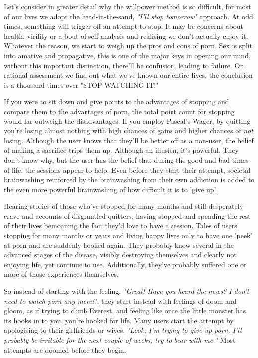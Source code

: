 \documentclass[easypeasy.tex]{subfiles}
\begin{document}
Let's consider in greater detail why the willpower method is so difficult, for most of our lives we adopt the head-in-the-sand, \textit{"I'll stop tomorrow"} approach. At odd times, something will trigger off an attempt to stop. It may be concerns about health, virility or a bout of self-analysis and realising we don't actually enjoy it. Whatever the reason, we start to weigh up the pros and cons of porn. Sex is split into amative and propagative, this is one of the major keys in opening our mind, without this important distinction, there'll be confusion, leading to failure. On rational assessment we find out what we've known our entire lives, the conclusion is a thousand times over "STOP WATCHING IT!"

If you were to sit down and give points to the advantages of stopping and compare them to the advantages of porn, the total point count for stopping would far outweigh the disadvantages. If you employ Pascal's Wager, by quitting you're losing almost nothing with high chances of gains and higher chances of \textit{not} losing. Although the user knows that they'll be better off as a non-user, the belief of making a sacrifice trips them up. Although an illusion, it's powerful. They don't know why, but the user has the belief that during the good and bad times of life, the sessions appear to help. Even before they start their attempt, societal brainwashing reinforced by the brainwashing from their own addiction is added to the even more powerful brainwashing of how difficult it is to 'give up'.

Hearing stories of those who've stopped for many months and still desperately crave and accounts of disgruntled quitters, having stopped and spending the rest of their lives bemoaning the fact they'd love to have a session. Tales of users stopping for many months or years and living happy lives only to have one 'peek' at porn and are suddenly hooked again. They probably know several in the advanced stages of the disease, visibly destroying themselves and clearly not enjoying life, yet continue to use. Additionally, they've probably suffered one or more of those experiences themselves.

So instead of starting with the feeling, \textit{"Great! Have you heard the news? I don't need to watch porn any more!"}, they start instead with feelings of doom and gloom, as if trying to climb Everest, and feeling like once the little monster has its hooks in to you, you're hooked for life. Many users start the attempt by apologising to their girlfriends or wives, \textit{"Look, I'm trying to give up porn. I'll probably be irritable for the next couple of weeks, try to bear with me."} Most attempts are doomed before they begin.
\end{document}
